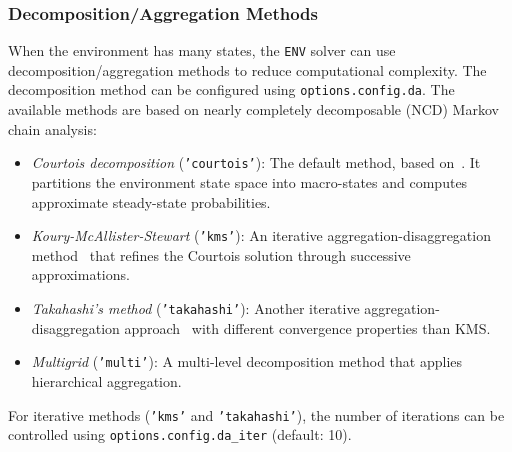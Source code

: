 \subsubsection{Decomposition/Aggregation Methods}
When the environment has many states, the \texttt{ENV} solver can use decomposition/aggregation methods to reduce computational complexity. The decomposition method can be configured using \texttt{options.config.da}. The available methods are based on nearly completely decomposable (NCD) Markov chain analysis:

\begin{itemize}
\item \textit{Courtois decomposition} (\texttt{'courtois'}): The default method, based on~\cite{courtois1977decomposability}. It partitions the environment state space into macro-states and computes approximate steady-state probabilities.
\item \textit{Koury-McAllister-Stewart} (\texttt{'kms'}): An iterative aggregation-disaggregation method~\cite{koury1984iterative} that refines the Courtois solution through successive approximations.
\item \textit{Takahashi's method} (\texttt{'takahashi'}): Another iterative aggregation-disaggregation approach~\cite{takahashi1975iterative} with different convergence properties than KMS.
\item \textit{Multigrid} (\texttt{'multi'}): A multi-level decomposition method that applies hierarchical aggregation.
\end{itemize}

For iterative methods (\texttt{'kms'} and \texttt{'takahashi'}), the number of iterations can be controlled using \texttt{options.config.da\_iter} (default: 10).


